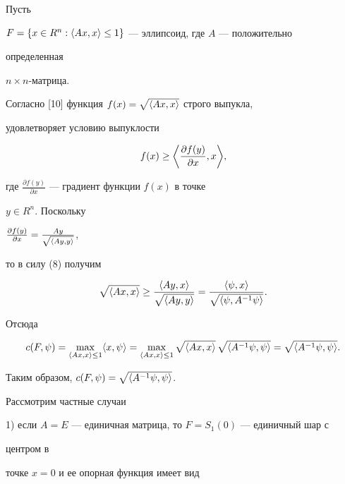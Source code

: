  


\begin{exam} 


Пусть 


$F=\{x\in R^n:\langle Ax,x\rangle\le1\}$ --- эллипсоид, где $A$ --- положительно 


определенная 


$n\times n$-матрица. 


Согласно [10] функция $f(x)=\sqrt{\langle Ax,x\rangle}$ строго выпукла,


удовлетворяет условию выпуклости 


\begin{equation} 


f(x)\ge\bigg\la\frac{\partial f(y)}{\partial x},x\bigg\ra, 


\end{equation} 


где $\frac{\partial f(y)}{\partial x}$ --- градиент функции $f(x)$ в точке 


$y\in R^n$. Поскольку 


$\frac{\partial f(y)}{\partial x}= 


\frac{A y}{\sqrt{\la A y,y\ra}}$, 


то в силу (8) получим 


$$ 


\sqrt{\la Ax,x\ra}\ge\frac{\la A y,x\ra}{\sqrt{\la A y,y\ra}}= 


\frac{\la\psi,x\ra}{\sqrt{\la\psi,A^{-1}\psi\ra}}. 


$$ 


Отсюда 


$$ 


c(F,\psi)=\max_{\la Ax,x\ra\le1}\la x,\psi\ra= 


\max_{\la Ax,x\ra\le1}\sqrt{\la Ax,x\ra}\, 


\sqrt{\la A^{-1}\psi,\psi\ra}= 


\sqrt{\la A^{-1}\psi,\psi\ra} .


$$ 


Таким образом, $c(F,\psi)=\sqrt{\langle A^{-1}\psi,\psi\rangle}$. 


 


Рассмотрим частные случаи


 


1) если $A=E$ --- единичная матрица, то $F=S_1(0)$ --- единичный шар с 


центром в 


точке $x=0$ и ее опорная функция имеет вид 



\end{exam}
